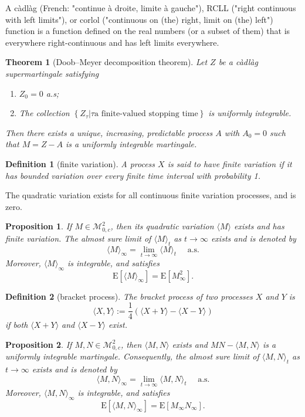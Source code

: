\documentclass{article}
\newtheorem{definition}{Definition}[section]
\newtheorem{proposition}{Proposition}[section]
\newtheorem{theorem}{Theorem}[section]
\theoremstyle{nonumberplain}
\begin{document}
A càdlàg (French: "continue à droite, limite à gauche"), RCLL ("right continuous with left limits"), or corlol ("continuous on (the) right, limit on (the) left") function is a function defined on the real numbers (or a subset of them) that is everywhere right-continuous and has left limits everywhere.

\begin{theorem}[Doob–Meyer decomposition theorem]
Let $Z$ be a càdlàg supermartingale satisfying
\begin{enumerate}
	\item $Z_0=0$ a.s;
	\item The collection $\left\{Z_{\tau}| \tau \text {a finite-valued stopping time}\right\}$ is uniformly integrable.
\end{enumerate}
Then there exists a unique, increasing, predictable process $A$ with $A_{0}=0$ such that $M=Z-A$ is a uniformly integrable martingale.
\end{theorem}

\begin{definition}[finite variation]	
	A process $X$ is said to have \emph{finite variation} if it has bounded variation over every finite time interval with probability 1.	
\end{definition}	

The quadratic variation exists for all continuous finite variation processes, and is zero.
 
\begin{proposition}
	If $M\in \mathscr{M}^2_{0,c}$, then its quadratic variation $\langle M\rangle$ exists and has finite variation. The almost sure limit of $\langle M\rangle_{t}$ as $t \rightarrow \infty$ exists and is denoted by
	\[
	\langle M\rangle_{\infty}=\lim_{t\to\infty}\langle M\rangle_{t}\quad\text{ a.s.}
	\]
	Moreover, $\langle M\rangle_{\infty}$ is integrable, and satisfies
	\[
	\mathrm{E}\left[\langle M\rangle_{\infty}\right]=\mathrm{E}\left[M_{\infty}^2\right].
	\]
\end{proposition}

\begin{definition}[bracket process]	
	The bracket process of two processes $X$ and $Y$ is
	\[
	\langle X, Y\rangle:=\frac{1}{4}\left(\langle X+Y\rangle-\langle X-Y\rangle\right)
	\] 
	if both $\langle X+Y\rangle$ and $\langle X-Y\rangle$ exist.
\end{definition}

\begin{proposition}
	If $M,N\in\mathscr{M}^2_{0,c}$, then $\langle M, N\rangle$ exists and $MN-\langle M, N\rangle$ is a uniformly integrable martingale. Consequently, the almost sure limit of $\langle M, N\rangle_{t}$ as $t \rightarrow \infty$ exists and is denoted by
	\[
	\langle M, N\rangle_{\infty}=\lim_{t\to\infty}\langle M, N\rangle_{t}\quad\text{ a.s.}
	\]
	Moreover, $\langle M, N\rangle_{\infty}$ is integrable, and satisfies
	\[
	\mathrm{E}\left[\langle M, N\rangle_{\infty}\right]=\mathrm{E}\left[M_{\infty} N_{\infty}\right].
	\]
\end{proposition}
\end{document}

